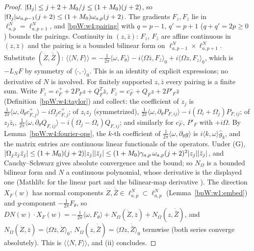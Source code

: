 \begin{proof}
\label{stepW:w4:liebd}
$\lvert \Omega_j\rvert\le j+2+M_0/j\le(1+M_0)(j+2)$, so $\lvert \Omega_j\rvert\omega_{a,p-1}(j+2)\le(1+M_0)\omega_{a,p}(j+2)$. The
gradients $F_z,F_{\bar z}$ lie in $\ell^N_{a,\bar p}=\ell^N_{a,p+1}$, and \eqref{bpW:w4:pairing} with $q=p-1$, $q'=p+1$
($q+q'=2p\ge0$) bounds the pairings. Continuity in $(z,\bar z)$: $F_z$, $F_{\bar z}$ are affine continuous in
$(z,\bar z)$ and the pairing is a bounded bilinear form on $\ell^N_{a,p-1}\times\ell^N_{a,p+1}$.
\label{stepW:w4:liebr}
Substitute $(\dot Z,\dot{\bar Z})$: $\langle\!\langle N,F\rangle\!\rangle=-\frac1{2\pi}\langle\omega,F_\theta\rangle-i\langle\Omega\bar z,F_{\bar z}\rangle_0
+i\langle\Omega z,F_z\rangle_0$, which is $-L_NF$ by symmetry of $\langle\cdot,\cdot\rangle_0$. This is an identity of explicit
expressions; no derivative of $N$ is involved.
\label{stepW:w4:liecoef}
For finitely supported $z,\bar z$ every pairing is a finite sum. Write $F_z=c^+_F+2P_Fz+Q_F^T\bar z$,
$F_{\bar z}=c^-_F+Q_Fz+2P'_F\bar z$ (Definition~\ref{bpW:w4:taylor}) and collect: the coefficient of $z_j$ is
$\frac1{2\pi}\langle\omega,\partial_\theta c^+_{F,j}\rangle-i\Omega_jc^+_{F,j}$; of $z_iz_j$ (symmetrized),
$\frac1{2\pi}\langle\omega,\partial_\theta P_{F,ij}\rangle-i(\Omega_i+\Omega_j)P_{F,ij}$; of $z_j\bar z_i$,
$\frac1{2\pi}\langle\omega,\partial_\theta Q_{F,ij}\rangle-i(\Omega_j-\Omega_i)Q_{F,ij}$; and similarly for $c^-_F$, $P'_F$ with
$+i\Omega$. By Lemma~\ref{bpW:w4:fourier-ops}, the $k$-th coefficient of $\frac1{2\pi}\langle\omega,\partial_\theta g\rangle$
is $i\langle k,\omega\rangle\hat g_k$, and the matrix entries are continuous linear functionals of the operators.
\label{stepW:w4:lieder}
Under (G), $\lvert \Omega_jz_j\bar z_j\rvert\le(1+M_0)(j+2)\lvert z_j\rvert\lvert \bar z_j\rvert\le(1+M_0)\gamma_{a,p}\,\omega_{a,p}(j+2)^2\lvert z_j\rvert\lvert \bar z_j\rvert$,
and Cauchy--Schwarz gives absolute convergence and the bound; so $N_\Omega$ is a bounded bilinear form and $N$ a
continuous polynomial, whose derivative is the displayed one (Mathlib:  for the
linear part and the bilinear-map derivative ). The direction $X_F(w)$ has
normal components $\dot Z,\dot{\bar Z}\in\ell^N_{a,\bar p}\subset\ell^N_{a,p}$ (Lemma~\ref{bpW:w1:embed}) and $y$-component
$-\frac1{2\pi}F_\theta$, so $DN(w)\cdot X_F(w)=-\frac1{2\pi}\langle\omega,F_\theta\rangle+N_\Omega(\dot Z,\bar z)+N_\Omega(z,\dot{\bar Z})$,
and $N_\Omega(\dot Z,\bar z)=\langle\Omega\bar z,\dot Z\rangle_0$, $N_\Omega(z,\dot{\bar Z})=\langle\Omega z,\dot{\bar Z}\rangle_0$ termwise
(both series converge absolutely). This is $\langle\!\langle N,F\rangle\!\rangle$, and (ii) concludes.
\end{proof}

